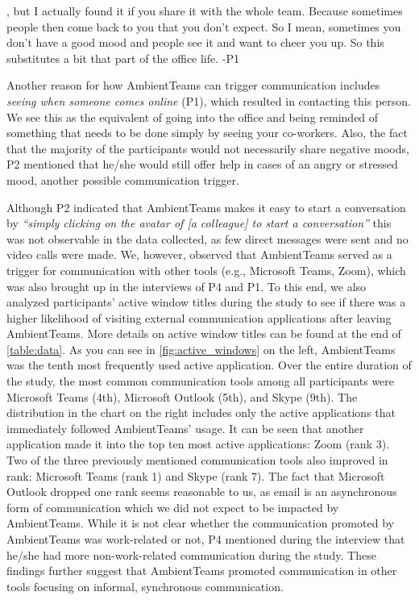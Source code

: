 \begin{displayquote}[][]
    [...], but I actually found it if you share it with the whole team. Because sometimes people then come back to you that you don't expect. So I mean, sometimes you don't have a good mood and people see it and want to cheer you up. So this substitutes a bit that part of the office life. -P1
\end{displayquote}

Another reason for how AmbientTeams can trigger communication includes \textit{seeing when someone comes online} (P1), which resulted in contacting this person. We see this as the equivalent of going into the office and being reminded of something that needs to be done simply by seeing your co-workers. Also, the fact that the majority of the participants would not necessarily share negative moods, P2 mentioned that he/she would still offer help in cases of an angry or stressed mood, another possible communication trigger.

Although P2 indicated that AmbientTeams makes it easy to start a conversation by \textit{\enquote{simply clicking on the avatar of [a colleague] to start a conversation}} this was not observable in the data collected, as few direct messages were sent and no video calls were made. We, however, observed that AmbientTeams served as a trigger for communication with other tools (e.g., Microsoft Teams, Zoom), which was also brought up in the interviews of P4 and P1. To this end, we also analyzed participants' active window titles during the study to see if there was a higher likelihood of visiting external communication applications after leaving AmbientTeams. More details on active window titles can be found at the end of \autoref{table:data}. As you can see in \autoref{fig:active_windows} on the left, AmbientTeams was the tenth most frequently used active application. Over the entire duration of the study, the most common communication tools among all participants were Microsoft Teams (4th), Microsoft Outlook (5th), and Skype (9th). The distribution in the chart on the right includes only the active applications that immediately followed AmbientTeams' usage. It can be seen that another application made it into the top ten most active applications: Zoom (rank 3). Two of the three previously mentioned communication tools also improved in rank: Microsoft Teams (rank 1) and Skype (rank 7). The fact that Microsoft Outlook dropped one rank seems reasonable to us, as email is an asynchronous form of communication which we did not expect to be impacted by AmbientTeams. While it is not clear whether the communication promoted by AmbientTeams was work-related or not, P4 mentioned during the interview that he/she had more non-work-related communication during the study. These findings further suggest that AmbientTeams promoted communication in other tools focusing on informal, synchronous communication.

